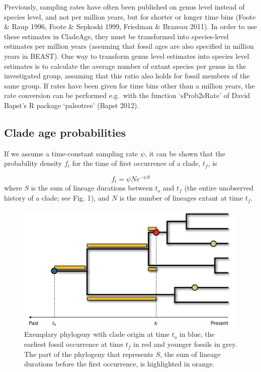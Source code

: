 \documentclass{article}
\begin{document}
Previously, sampling rates have often been published on genus level instead of species level, and not per million years, but for shorter or longer time bins (Foote \& Raup 1996, Foote \& Sepkoski 1999, Friedman \& Brazeau 2011). In order to use these estimates in CladeAge, they must be transformed into species-level estimates per million years (assuming that fossil ages are also specified in million years in BEAST). One way to transform genus level estimates into species level estimates is to calculate the average number of extant species per genus in the investigated group, assuming that this ratio also holds for fossil members of the same group. If rates have been given for time bins other than a million years, the rate conversion can be performed e.g.\ with the function `sProb2sRate' of David Bapst's R package `paleotree' (Bapst 2012).

\subsection{Clade age probabilities}

If we assume a time-constant sampling rate $\psi$, it can be shown that the probability density $f_t$ for the time of first occurrence of a clade, $t_f$, is

\begin{equation}
f_t = \psi N e^{-\psi S}
\end{equation}
where $S$ is the sum of lineage durations between $t_o$ and $t_f$ (the entire unobserved history of a clade; see Fig. 1), and $N$ is the number of lineages extant at time $t_f$.
\begin{figure}[b!]
\centering
\includegraphics[width=0.99\textwidth]{sumOfLineageDurations}
\caption{Exemplary phylogeny with clade origin at time $t_o$ in blue, the earliest fossil occurrence at time $t_f$ in red and younger fossils in grey. The part of the phylogeny that represents $S$, the sum of lineage durations before the first occurrence, is highlighted in orange.}
\end{figure}
\end{document}
